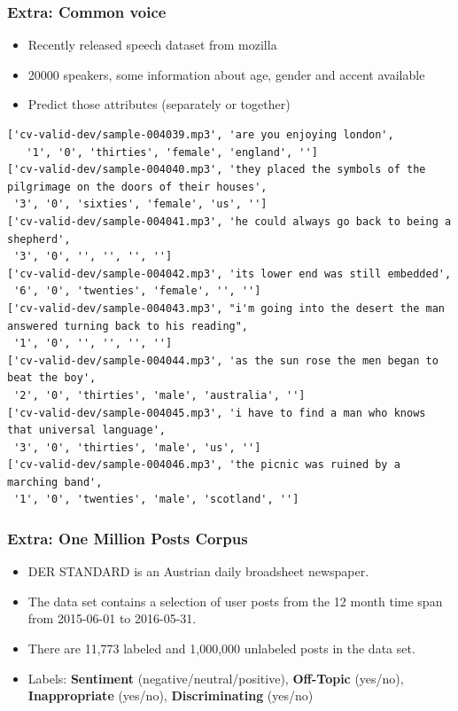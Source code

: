 \documentclass{beamer}
\begin{document}
\begin{frame}[fragile]
\frametitle{Extra: Common voice}
  \begin{itemize}
	\item Recently released speech dataset from mozilla
	\item 20000 speakers, some information about age, gender and accent available
	\item Predict those attributes (separately or together)
  \end{itemize}
  \begin{Verbatim}[fontsize=\tiny]
  ['cv-valid-dev/sample-004039.mp3', 'are you enjoying london',
   '1', '0', 'thirties', 'female', 'england', '']
['cv-valid-dev/sample-004040.mp3', 'they placed the symbols of the pilgrimage on the doors of their houses',
 '3', '0', 'sixties', 'female', 'us', '']
['cv-valid-dev/sample-004041.mp3', 'he could always go back to being a shepherd',
 '3', '0', '', '', '', '']
['cv-valid-dev/sample-004042.mp3', 'its lower end was still embedded',
 '6', '0', 'twenties', 'female', '', '']
['cv-valid-dev/sample-004043.mp3', "i'm going into the desert the man answered turning back to his reading",
 '1', '0', '', '', '', '']
['cv-valid-dev/sample-004044.mp3', 'as the sun rose the men began to beat the boy',
 '2', '0', 'thirties', 'male', 'australia', '']
['cv-valid-dev/sample-004045.mp3', 'i have to find a man who knows that universal language',
 '3', '0', 'thirties', 'male', 'us', '']
['cv-valid-dev/sample-004046.mp3', 'the picnic was ruined by a marching band',
 '1', '0', 'twenties', 'male', 'scotland', '']
  \end{Verbatim}
\end{frame}

\begin{frame}[fragile]
\frametitle{Extra: One Million Posts Corpus}
  \begin{itemize}
\item DER STANDARD is an Austrian daily broadsheet newspaper. 
\item The data set contains a selection of user posts from the 12 month time span from 2015-06-01 to 2016-05-31. 
\item There are 11,773 labeled and 1,000,000 unlabeled posts in the data set.
\item Labels: \textbf{Sentiment} (negative/neutral/positive), \textbf{Off-Topic} (yes/no), \textbf{Inappropriate} (yes/no), \textbf{Discriminating} (yes/no)
  \end{itemize}
\end{frame}
\end{document}

